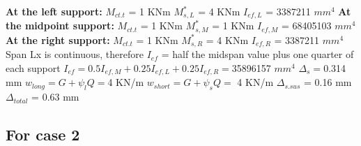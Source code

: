 \documentclass{article}%
\begin{document}
%
\newline%
\newline%
%
\textbf{At the left support:}%
\newline%
\newline%
%
$M_{ct.t}$ = 1 KNm%
\newline%
%
$M_{s,L}^{*}$ = 4 KNm%
\newline%
%
$I_{ef,L}$ = 3387211 $mm^{4}$%
\newline%
\newline%
%
\textbf{At the midpoint support:}%
\newline%
\newline%
%
$M_{ct.t}$ = 1 KNm%
\newline%
%
$M_{s,M}^{*}$ = 1 KNm%
\newline%
%
$I_{ef,M}$ = 68405103 $mm^{4}$%
\newline%
\newline%
%
\textbf{At the right support:}%
\newline%
\newline%
%
$M_{ct.t}$ = 1 KNm%
\newline%
%
$M_{s,R}^{*}$ = 4 KNm%
\newline%
%
$I_{ef,R}$ = 3387211 $mm^{4}$%
\newline%
\newline%
%
Span Lx is continuous, therefore $I_{ef}$ = half the midspan value plus one quarter of each support%
\newline%
\newline%
%
$I_{ef} = 0.5I_{ef,M} + 0.25I_{ef,L} + 0.25I_{ef,R} = $35896157 $ mm^{4}$%
\newline%
\newline%
%
$\Delta_{s} =$0.314 mm%
\newline%
\newline%
%
$w_{long} = G + \psi_{l}Q = $4 KN/m%
\newline%
%
$w_{short} = G + \psi_{s}Q = $ 4 KN/m%
\newline%
\newline%
%
$\Delta_{s.sus}$ = 0.16 mm%
\newline%
\newline%
%
$\Delta_{total}$ = 0.63 mm%
\subsection*{For case 2}%
\label{subsec:Forcase2}%
\end{document}
